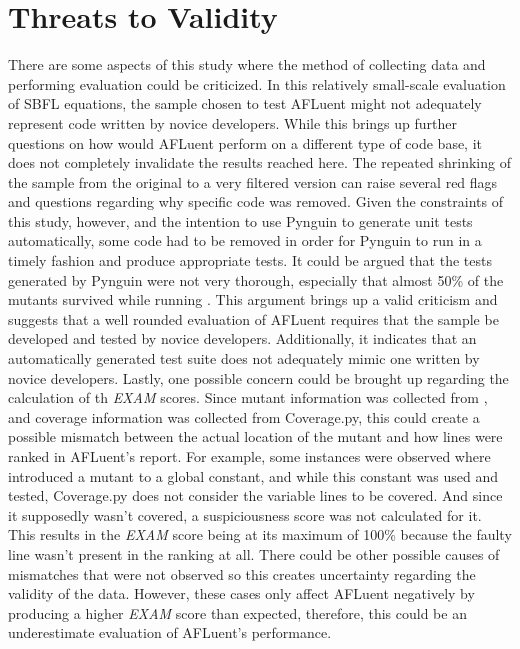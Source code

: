 \section{Threats to Validity}

There are some aspects of this study where the method of collecting data and
performing evaluation could be criticized. In this relatively small-scale
evaluation of SBFL equations, the sample chosen to test AFLuent might not
adequately represent code written by novice developers. While this brings up
further questions on how would AFLuent perform on a different type of code base, it
does not completely invalidate the results reached here. The repeated shrinking of the
sample from the original  to a very filtered version
can raise several red flags and questions regarding why specific code was
removed. Given the constraints of this study, however, and the intention to
use Pynguin to generate unit tests automatically, some code had to be removed in order
for Pynguin to run in a timely fashion and produce appropriate tests. It could
be argued that the tests generated by Pynguin were not very thorough, especially
that almost 50\% of the mutants survived while running . This
argument brings up a valid criticism and suggests that a well rounded evaluation
of AFLuent requires that the sample be developed and tested by novice developers. Additionally, it indicates that an automatically generated
test suite does not adequately mimic one written by novice developers.
Lastly, one possible concern could be brought up regarding the calculation of th
\emph{EXAM} scores. Since mutant information was collected from ,
and coverage information was collected from Coverage.py, this could create a
possible mismatch between the actual location of the mutant and how lines were
ranked in AFLuent's report. For example, some instances were observed where
 introduced a mutant to a global constant, and while this constant
was used and tested, Coverage.py does not consider the variable lines to be
covered. And since it supposedly wasn't covered, a suspiciousness score was not
calculated for it. This results in the \emph{EXAM} score being at its maximum of
100\% because the faulty line wasn't present in the ranking at all. There could
be other possible causes of mismatches that were not observed so this creates
uncertainty regarding the validity of the data. However, these cases only affect
AFLuent negatively by producing a higher \emph{EXAM} score than expected, therefore,
this could be an underestimate evaluation of AFLuent's performance.